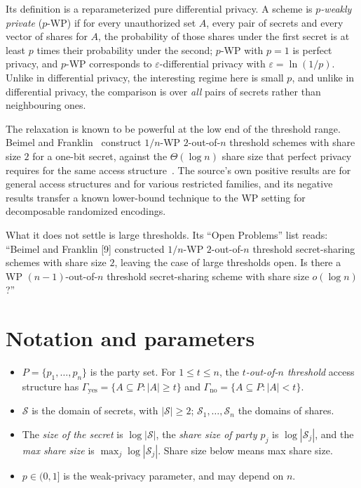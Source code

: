 \documentclass{aicr-conjecture}
\newcommand{\Sh}{\mathcal{S}}
\begin{document}
Its definition is a reparameterized pure differential privacy. A scheme
is \emph{$p$-weakly private} ($p$-WP) if for every unauthorized set $A$,
every pair of secrets and every vector of shares for $A$, the
probability of those shares under the first secret is at least $p$ times
their probability under the second; $p$-WP with $p = 1$ is perfect
privacy, and $p$-WP corresponds to $\varepsilon$-differential privacy
with $\varepsilon = \ln(1/p)$. Unlike in differential privacy, the
interesting regime here is small $p$, and unlike in differential
privacy, the comparison is over \emph{all} pairs of secrets rather than
neighbouring ones.

The relaxation is known to be powerful at the low end of the threshold
range. Beimel and Franklin~\cite{BF07} construct $1/n$-WP
$2$-out-of-$n$ threshold schemes with share size $2$ for a one-bit
secret, against the $\Theta(\log n)$ share size that perfect privacy
requires for the same access structure~\cite{Shamir79,Blakley79,KN90,CCX13}.
The source's own positive results are for general access structures and
for various restricted families, and its negative results transfer a
known lower-bound technique to the WP setting for decomposable
randomized encodings.

What it does not settle is large thresholds. Its ``Open Problems'' list
reads: ``Beimel and Franklin [9] constructed $1/n$-WP $2$-out-of-$n$
threshold secret-sharing schemes with share size $2$, leaving the case of
large thresholds open. Is there a WP $(n-1)$-out-of-$n$ threshold
secret-sharing scheme with share size $o(\log n)$?''

\section{Notation and parameters}\label{sec:notation}

\begin{itemize}[nosep]
  \item $P = \{p_{1}, \dots, p_{n}\}$ is the party set. For $1 \le t \le
    n$, the \emph{$t$-out-of-$n$ threshold} access structure has
    $\Gamma_{\mathrm{yes}} = \{A \subseteq P : |A| \ge t\}$ and
    $\Gamma_{\mathrm{no}} = \{A \subseteq P : |A| < t\}$.
  \item $\Sh$ is the domain of secrets, with $|\Sh| \ge 2$; $\Sh_{1},
    \dots, \Sh_{n}$ the domains of shares.
  \item The \emph{size of the secret} is $\log|\Sh|$, the \emph{share
    size of party $p_{j}$} is $\log|\Sh_{j}|$, and the \emph{max share
    size} is $\max_{j} \log|\Sh_{j}|$. Share size below means max share
    size.
  \item $p \in (0,1]$ is the weak-privacy parameter, and may depend on
    $n$.
\end{itemize}
\end{document}
